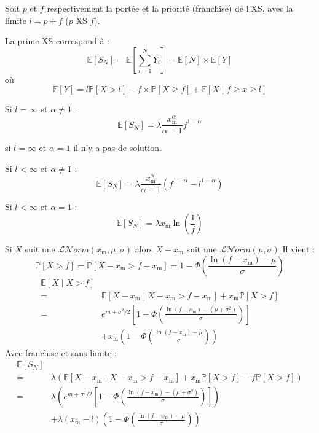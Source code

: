 \begin{f}
Soit $p$ et $f$ respectivement la portée et la priorité (franchise) de l'XS, avec la limite $l=p+f$ ($p$ XS $f$).

La prime XS correspond à :
$$
\mathbb{E}\left[S_N\right]=\mathbb{E}\left[\sum_{i=1}^{N} Y_{i}\right]=\mathbb{E}[N]\times \mathbb{E}[Y]
$$
où
$$
\mathbb{E}[Y]= l \mathbb{P}[X>l] - f \times \mathbb{P}[X\geq f] + \mathbb{E}[X\mid f\geq x\geq l]
$$


Si $l=\infty$ et $\alpha \neq 1$ :
$$
\mathbb{E}[S_N] = \lambda \frac{x_\mathrm{m}^{\alpha}}{\alpha -1}f^{1-\alpha} 
$$

si  $l=\infty$ et $\alpha = 1$ il n'y a pas de solution.

Si $l<\infty$ et $\alpha \neq 1$ :
$$
\mathbb{E}[S_N] = \lambda \frac{x_\mathrm{m}^{\alpha}}{\alpha -1}\left( f^{1-\alpha} -l^{1-\alpha} \right)
$$

Si $l<\infty$ et $\alpha = 1$ :
$$
\mathbb{E}[S_N] = \lambda x_\mathrm{m} \ln \left(  \frac{1}{f}\right)
$$
\end{f}



\begin{f}

Si $X$ suit une $\mathcal{L}\mathcal{N}orm(x_\mathrm{m}, \mu, \sigma)$ alors $X-x_\mathrm{m}$ suit une $\mathcal{L}\mathcal{N}orm(\mu, \sigma)$
Il vient :
$$
\mathbb{P}[X>f]=\mathbb{P}[X-x_\mathrm{m}>f-x_\mathrm{m}]=1-\Phi\left(\frac{\ln(f-x_\mathrm{m})-\mu}{\sigma}\right)
$$
\begin{align*}
	\mathbb{E}[X\mid X>f] \\ 
	= & \mathbb{E}\left[ X-x_\mathrm{m}\mid X-x_\mathrm{m}>f-x_\mathrm{m} \right]+x_\mathrm{m} \mathbb{P}[X>f]\\
	= & e ^{m+\sigma^2/2} \left[1-\Phi\left(\frac{\ln(f-x_\mathrm{m})-(\mu+\sigma^2)}{\sigma}\right) \right]\\
	& +x_\mathrm{m} \left( 1-\Phi\left(\frac{\ln(f-x_\mathrm{m})-\mu}{\sigma}\right) \right)
\end{align*}
Avec franchise et sans limite :
\begin{align*}
	\mathbb{E}[S_N] \\ 
	= & \lambda \left(\mathbb{E}\left[ X-x_\mathrm{m}\mid X-x_\mathrm{m}>f-x_\mathrm{m} \right]+x_\mathrm{m} \mathbb{P}[X>f]-f\mathbb{P}[X>f]\right)\\
	= & \lambda \left(  e ^{m+\sigma^2/2} \left[1-\Phi\left(\frac{\ln(f-x_\mathrm{m})-(\mu+\sigma^2)}{\sigma}\right) \right]\right)\\
	& +\lambda (x_\mathrm{m}-l) \left( 1-\Phi\left(\frac{\ln(f-x_\mathrm{m})-\mu}{\sigma}\right) \right)
\end{align*}

\end{f}